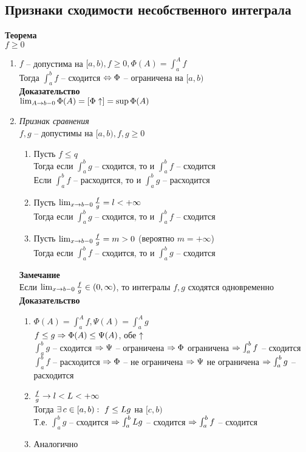 \documentclass[12pt]{article}
\begin{document}
\subsection{Признаки сходимости несобственного интеграла}
\textbf{Теорема}\\
$f \geq 0$
\begin{enumerate}
    \item $f$ -- допустима на $[a,b), f \geq 0, \Phi(A) = \int_a^A f$\\
    Тогда $\int_a^b f$ -- сходится $\Leftrightarrow \Phi$ -- ограничена на $[a,b)$\\
    \textbf{Доказательство}\\
    $\lim_{A\rightarrow b-0} \Phi(A) = [\Phi \uparrow] = \sup \Phi(A)$
    \item \textit{Признак сравнения}\\
    $f, g$ -- допустимы на $[a,b), f,g \geq 0$
    \begin{enumerate}
        \item Пусть $f \leq q$\\
        Тогда если $\int_a^b g$ -- сходится, то и $\int_a^b f$ -- сходится\\
        Если $\int_a^b f$ -- расходится, то и $\int_a^b g$ -- расходится
        \item Пусть $\lim_{x\rightarrow b-0}\frac fg = l < +\infty$\\
        Тогда если $\int_a^b g$ -- сходится, то и $\int_a^b f$ -- сходится\\
        \item Пусть $\lim_{x\rightarrow b-0}\frac fg = m > 0$ (вероятно $m = +\infty$)\\
        Тогда если $\int_a^b f$ -- сходится, то и $\int_a^b g$ -- сходится\\
    \end{enumerate}
    \textbf{Замечание}\\
    Если $\lim_{x\rightarrow b-0}\frac fg \in (0, \infty)$, то интегралы $f,g$ сходятся одновременно\\
    \textbf{Доказательство}
    \begin{enumerate}
        \item $\Phi(A) = \int_a^A f, \Psi (A) = \int_a^A g$\\
        $f \leq g \Rightarrow \Phi(A) \leq \Psi(A)$, обе $\uparrow$\\
        $\int_a^b g$ -- сходится $\Rightarrow \Psi$ -- ограничена $\Rightarrow \Phi$ ограничена $\Rightarrow \int_a^b f$ -- сходится\\
        $\int_a^b f$ -- расходится $\Rightarrow \Phi$ -- не ограничена $\Rightarrow \Psi$ не ограничена $\Rightarrow \int_a^b g$ -- расходится
        \item $\frac fg \rightarrow l < L < +\infty$\\
        Тогда $\exists\, c\in[a,b):\ f\leq Lg$ на $[c,b)$\\
        Т.е. $\int_a^b g$ -- сходится $\Rightarrow \int_a^b Lg$ -- сходится $\Rightarrow \int_a^b f$ -- сходится
        \item Аналогично
    \end{enumerate}
\end{enumerate}
\end{document}

